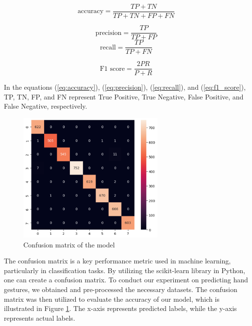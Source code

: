 \begin{equation}
	\text{accuracy} = \frac{TP + TN}{TP + TN + FP +FN}
	\label{eq:accuracy}
\end{equation}

\begin{equation}
	\text{precision} = \frac{TP}{TP + FP}
	\label{eq:precision}
\end{equation}
\begin{equation}
	\text{recall} = \frac{TP}{TP + FN}
	\label{eq:recall}
\end{equation}

\begin{equation}
	\text{F1 score} = \frac{2 P  R}{P+ R} 
	\label{eq:f1_score}
\end{equation}

In the equations (\ref{eq:accuracy}), (\ref{eq:precision}), (\ref{eq:recall}), and (\ref{eq:f1_score}), TP, TN, FP, and FN represent True Positive, True Negative, False Positive,
and False Negative, respectively.

\begin{figure}[h!]
	\centering
	\includegraphics[width = 0.65\textwidth]{images/confusion_matrix.pdf}
	\caption{Confusion matrix of the model}
	\label{fig:confusion_matrix}
\end{figure}


The confusion matrix is a key performance metric used in machine learning, particularly in classification tasks. By utilizing the scikit-learn library in Python, one can create a confusion matrix. To conduct our experiment on predicting hand gestures, we obtained and pre-processed the necessary datasets. The confusion matrix was then utilized to evaluate the accuracy of our model, which is illustrated in Figure \ref{fig:confusion_matrix}. The x-axis represents predicted labels, while the y-axis represents actual labels.

